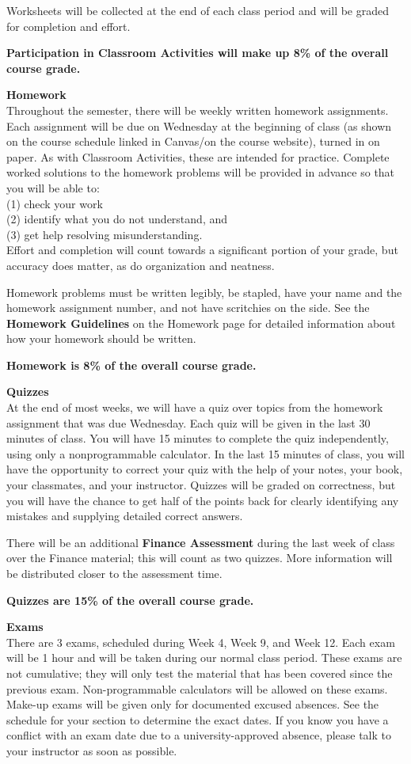 \documentclass[11pt]{article}
\renewcommand{\emph}[1]{\textsf{\textbf{#1}}}
\newcommand{\localhead}[1]{\par\smallskip\textbf{#1} \smallskip\nobreak\\}%
\def\heading#1{\localhead{\large\emph{#1}}}
\begin{document}
Worksheets will be collected at the end of each class period and will be graded for completion and effort.


\emph{Participation in Classroom Activities will make up 8\% of the overall course
grade.} 

\heading{Homework}
Throughout the semester, there will be weekly written homework assignments. Each assignment will be
due on Wednesday at the beginning of class (as shown on the course schedule linked in Canvas/on the course website), turned in on paper.  As with Classroom Activities,
these are intended for practice. Complete worked solutions to the homework problems will be provided in advance so that you will be able to:\\
(1) check your work\\
(2) identify what you do not understand, and \\
(3) get help resolving misunderstanding.\\
Effort and
completion will count towards a significant portion of your grade, but
accuracy does matter, as do organization and neatness. 

Homework problems must be written legibly, be stapled, have your name and the homework assignment number, and not have scritchies on the side. See the \emph{Homework Guidelines} on the Homework page for detailed information about how your homework should be written.  


\emph{Homework is 8\% of the overall course
grade.}

\heading{Quizzes}
At the end of most weeks, we will have a quiz over topics from the homework assignment that was due Wednesday. Each quiz will be given in the last 30 minutes of class. You will have 15 minutes to complete the quiz independently, using only a nonprogrammable calculator. In the last 15 minutes of class, you will have the opportunity to correct your quiz with the help of your notes, your book, your classmates, and your instructor. Quizzes will be graded on correctness, but you will have the chance to get half of the points back for clearly identifying any mistakes and supplying detailed correct answers. 

There will be an additional \emph{Finance Assessment} during the last week of class over the Finance material; this will count as two quizzes. More information will be distributed closer to the assessment time.

\emph{Quizzes are 15\% of the overall course
grade.}


\heading{Exams}
There are 3 exams, scheduled during Week 4, Week 9, and Week 12. Each exam will be 1 hour and will be taken during our normal class period. These exams are
not cumulative; they will only test the material that has been covered since the previous exam. Non-programmable calculators will be allowed on these exams. Make-up
exams will be given only for documented excused absences. See the schedule for your section to determine the exact dates. If you know you have a conflict with an exam date due to a university-approved absence, please talk to your instructor as soon as possible.
\end{document}
